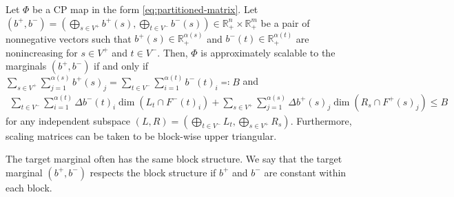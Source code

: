 \documentclass[a4paper,11pt]{article}
\numberwithin{equation}{section}
\newcommand{\R}{\mathbb{R}}
\begin{document}
\begin{lemma}\label{lem:opscaling-marginals-block}
    Let $\Phi$ be a CP map in the form \eqref{eq:partitioned-matrix}.
    Let $(b^+, b^-) = (\bigoplus_{s \in V^+} b^+(s), \bigoplus_{t \in V^-} b^-(s)) \in \R^n_+ \times \R^m_+$ be a pair of nonnegative vectors such that $b^+(s) \in \R_+^{\alpha(s)}$ and $b^-(t) \in \R_+^{\alpha(t)}$ are nonincreasing for $s \in V^+$ and $t \in V^-$.
    Then, $\Phi$ is approximately scalable to the marginals $(b^+, b^-)$ if and only if $\sum_{s \in V^+}\sum_{j=1}^{\alpha(s)} b^+(s)_j = \sum_{t \in V^-} \sum_{i=1}^{\alpha(t)} b^-(t)_i \eqqcolon B$ and
    \begin{align}
        \sum_{t \in V^-}\sum_{i=1}^{\alpha(t)} \Delta b^-(t)_i \dim(L_t \cap F^-(t)_i) +  \sum_{s \in V^+} \sum_{j=1}^{\alpha(s)} \Delta b^+(s)_j \dim(R_s \cap F^+(s)_j) \leq B
    \end{align}
    for any independent subspace $(L,R) = (\bigoplus_{t \in V^-} L_t, \bigoplus_{s \in V^+} R_s)$.
    Furthermore, scaling matrices can be taken to be block-wise upper triangular.
\end{lemma}

The target marginal often has the same block structure.
We say that the target marginal $(b^+, b^-)$ respects the block structure if $b^+$ and $b^-$ are constant within each block.
\end{document}
